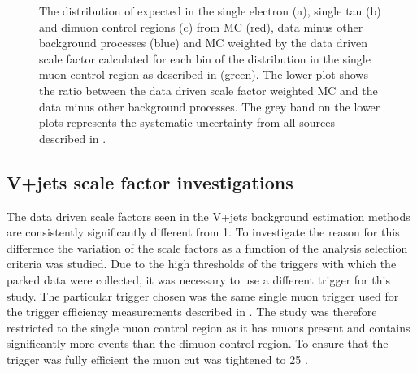 \begin{figure}
  \caption{The distribution of \METnoMU expected in the single electron (a), single tau (b) and dimuon control regions (c) from \ac{MC} (red), data minus other background processes (blue) and \ac{MC} weighted by the data driven scale factor calculated for each bin of the \METnoMU distribution in the single muon control region as described in  (green). The lower plot shows the ratio between the data driven scale factor weighted \ac{MC} and the data minus other background processes. The grey band on the lower plots represents the systematic uncertainty from all sources described in .}
  \label{fig:parkedclosure}
\end{figure}

\subsection{V+jets scale factor investigations}
\label{sec:parkedscalefactors}
The data driven scale factors seen in the V+jets background estimation methods are consistently significantly different from 1. To investigate the reason for this difference the variation of the scale factors as a function of the analysis selection criteria was studied. Due to the high thresholds of the triggers with which the parked data were collected, it was necessary to use a different trigger for this study. The particular trigger chosen was the same single muon trigger used for the trigger efficiency measurements described in . The study was therefore restricted to the single muon control region as it has muons present and contains significantly more events than the dimuon control region. To ensure that the trigger was fully efficient the muon \pt cut was tightened to 25 \GeV.

